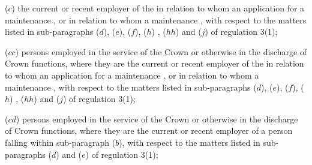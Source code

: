 \documentclass[a4paper,12pt]{article}
\begin{document}
\begin{enumerate}
($c$) the current or recent employer of the  
in relation to whom an application for a maintenance 
,  %
or in relation to whom a maintenance 
,  %
with respect to the matters listed in sub-paragraphs ($d$), ($e$), ($f$), ($h$)%
, ($hh$)  %
and ($j$) of regulation 3(1);

($cc$) persons employed in the service of the Crown or otherwise in the discharge of Crown functions, where they are the current or recent employer of the  
in relation to whom an application for a maintenance 
,  %
or in relation to whom a maintenance 
,  %
% 
with respect to the matters listed in sub-paragraphs ($d$), ($e$), ($f$), ($h$)%
, ($hh$)  %
and ($j$) of regulation 3(1);

($cd$) persons employed in the service of the Crown or otherwise in the discharge of Crown functions, where they are the current or recent employer of a person falling within sub-paragraph ($b$), with respect to the matters listed in sub-paragraphs ($d$) and ($e$) of regulation 3(1);


\end{enumerate}
\end{document}

